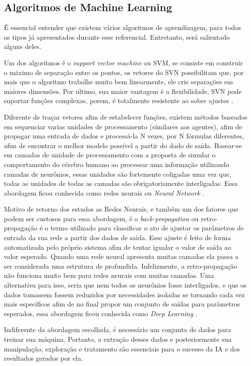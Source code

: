 \subsection{Algoritmos de Machine Learning}
É essencial entender que existem vários algoritmos de aprendizagem, para todos os tipos já apresentados durante esse referencial. Entretanto, será salientado alguns deles.

Um dos algoritmos é o \textit{support vector machine} ou SVM, se consiste em construir o máximo de separação entre os pontos, os vetores do SVN possibilitam que, por mais que o algoritmo trabalhe muito bem linearmente, ele crie separações em maiores dimensões. Por ultimo, sua maior vantagem é a flexibilidade, SVN pode suportar funções complexas, porem, é totalmente resistente ao sobre ajustes \cite[744]{russel2003artificial}.

Diferente de traçar vetores afim de estabelecer funções, existem métodos baseados em sequenciar varias unidades de processamento (similares aos agentes), afim de propagar uma entrada de dados e processá-la N vezes, por N fórmulas diferentes, afim de encontrar o melhor modelo possível a partir do dado de saída. Basear-se em camadas de unidade de processamento com a proposta de simular o comportamento do cérebro humano ao processar uma informação utilizando camadas de neurônios, essas unidades são fortemente coligadas uma vez que, todas as unidades de todas as camadas são obrigatoriamente interligadas. Essa abordagem ficou conhecida como redes neurais ou \textit{Neural Network} \cite{haykin2004comprehensive, russel2003artificial}.

Motivo de retorno dos estudos as Redes Neurais, e também um dos fatores que podem ser custosos para essa abordagem, é o \textit{back-propagation} ou retro-propagação é o termo utilizado para classificar o ato de ajustar os parâmetros de entrada da sua rede a partir dos dados de saída. Esse ajuste é feito de forma automatizada pelo próprio sistema afim de tentar igualar o valor de saída ao valor esperado. Quando uma rede neural apresenta muitas camadas ela passa a ser considerada uma estrutura de profundida. Infelizmente, a retro-propagação não funciona muito bem para redes neurais com muitas camadas. Uma alternativa para isso, seria que nem todos os neurônios fosse interligados, e que os dados tomassem fossem reduzidos por necessidades isoladas se tornando cada vez mais específicos afim de no final propor um conjunto de saídas para parâmetros esperados, essa abordagem ficou conhecida como \textit{Deep Learning} \cite{lecun2015deep}.

Indiferente da abordagem escolhida, é necessário um conjunto de dados para treinar sua máquina. Portanto, a extração desses dados e posteriormente sua manipulação, exploração e tratamento são essenciais para o sucesso da IA e dos resultados gerados por ela.
